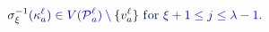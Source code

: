 \documentclass[12pt]{article}
\begin{document}
\makeatletter
\renewcommand*{\@textcolor}[3]{%
  \protect\leavevmode
  \begingroup
    \color#1{#2}#3%
  \endgroup
}
\makeatother
\begin{displaymath}
\mathcolor[RGB]{0,0,15}{\sigma} _ { \mathcolor[RGB]{0,0,30}{\xi} } ^ { \mathcolor[RGB]{0,0,45}{-} \mathcolor[RGB]{0,0,60}{1} } \mathcolor[RGB]{0,0,75}{(} \mathcolor[RGB]{0,0,90}{\kappa} _ { \mathcolor[RGB]{0,0,105}{a} } ^ { \mathcolor[RGB]{0,0,120}{\ell} } \mathcolor[RGB]{0,0,135}{)} \mathcolor[RGB]{0,0,150}{\in} \mathcolor[RGB]{0,0,165}{V} \mathcolor[RGB]{0,0,180}{(} \mathcal { \mathcolor[RGB]{0,0,195}{P} } _ { \mathcolor[RGB]{0,0,210}{a} } ^ { \mathcolor[RGB]{0,0,225}{\ell} } \mathcolor[RGB]{0,0,240}{)} \mathcolor[RGB]{0,0,255}{\setminus} \mathcolor[RGB]{0,15,0}{\{} \mathcolor[RGB]{0,15,15}{v} _ { \mathcolor[RGB]{0,15,30}{a} } ^ { \mathcolor[RGB]{0,15,45}{\ell} } \mathcolor[RGB]{0,15,60}{\}} \mathrm { ~ \mathcolor[RGB]{0,15,75}{f} \mathcolor[RGB]{0,15,90}{o} \mathcolor[RGB]{0,15,105}{r} ~ } \mathcolor[RGB]{0,15,120}{\xi} \mathcolor[RGB]{0,15,135}{+} \mathcolor[RGB]{0,15,150}{1} \mathcolor[RGB]{0,15,165}{\leq} \mathcolor[RGB]{0,15,180}{j} \mathcolor[RGB]{0,15,195}{\leq} \mathcolor[RGB]{0,15,210}{\lambda} \mathcolor[RGB]{0,15,225}{-} \mathcolor[RGB]{0,15,240}{1} \mathcolor[RGB]{0,15,255}{.}
\end{displaymath}
\end{document}
